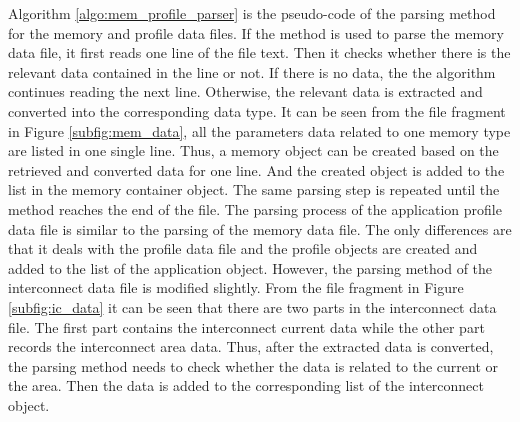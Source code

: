 	
	
	Algorithm \ref{algo:mem_profile_parser} is the pseudo-code of
	the parsing method for the memory and profile data files. If the method is
	used to parse the memory data file, it first reads one line of the file text.
	Then it checks whether there is the relevant data contained in the line or not.
	If there is no data, the the algorithm continues reading the next line.
	Otherwise, the relevant data is extracted and converted into the corresponding
	data type.
	It can be seen from the file fragment in Figure \ref{subfig:mem_data}, all the
	parameters data related to one memory type are listed in one single line.
	Thus, a memory object can be created based on the retrieved and converted data
	for one line. And the created object is added to the list in the memory container
	object. The same parsing step is repeated until the method reaches the end of
	the file. The parsing process of the application profile data file is similar
	to the parsing of the memory data file.
	The only differences are that it deals with the profile data file and the
	profile objects are created and added to the list of the application object.
	However, the parsing method of the interconnect data file is modified slightly.
	From the file fragment in Figure \ref{subfig:ic_data} it can be seen that there
	are two parts in the interconnect data file.
	The first part contains the interconnect current data while the other part
	records the interconnect area data. Thus, after the extracted data is converted,
	the parsing method needs to check whether the data is related to the current or
	the area. Then the data is added to the corresponding list of the interconnect
	object.
	
	
	
	
	
	
